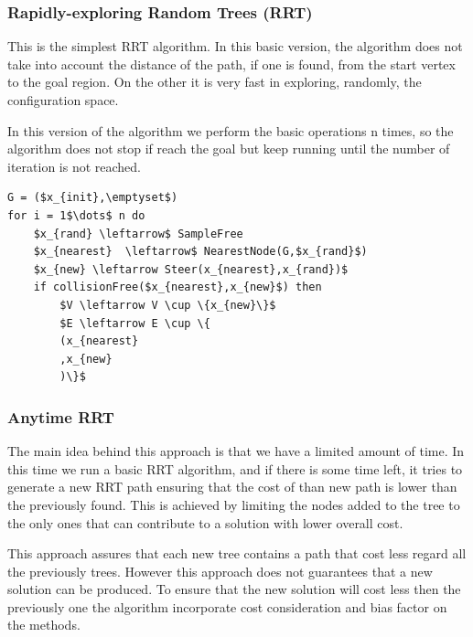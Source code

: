 \documentclass[10pt]{article}
\begin{document}
	\subsubsection{Rapidly-exploring Random Trees (RRT)}
	
	This is the simplest RRT algorithm. In this basic version, the algorithm does not take into account the distance of the path, if one is found, from the start vertex to the goal region. On the other it is very fast in exploring, randomly, the configuration space.

	In this version of the algorithm we perform the basic operations n times, so the algorithm does not stop if reach the goal but keep running until the number of iteration is not reached. 
	\begin{lstlisting}[frame=single, mathescape=true,caption={RRT}]
G = ($x_{init},\emptyset$)
for i = 1$\dots$ n do
	$x_{rand} \leftarrow$ SampleFree
	$x_{nearest}  \leftarrow$ NearestNode(G,$x_{rand}$)
	$x_{new} \leftarrow Steer(x_{nearest},x_{rand})$	
	if collisionFree($x_{nearest},x_{new}$) then
		$V \leftarrow V \cup \{x_{new}\}$
		$E \leftarrow E \cup \{
		(x_{nearest}
		,x_{new}
		)\}$
	\end{lstlisting}
	
	\subsubsection{Anytime RRT}
	
	The main idea behind this approach is that we have a limited amount of time. In this time we run a basic RRT algorithm, and if there is some time left, it tries to generate a new RRT path ensuring that the cost of than new path is lower than the previously found. This is achieved by limiting the nodes added to the tree to the only ones that can contribute to a solution with lower overall cost. 
	
	This approach assures that each new tree contains a path that cost less regard all the previously trees. However this approach does not guarantees that a new solution can be produced. To ensure that the new solution will cost less then the previously one the algorithm incorporate cost consideration and bias factor on the methods.
	
\end{document}
